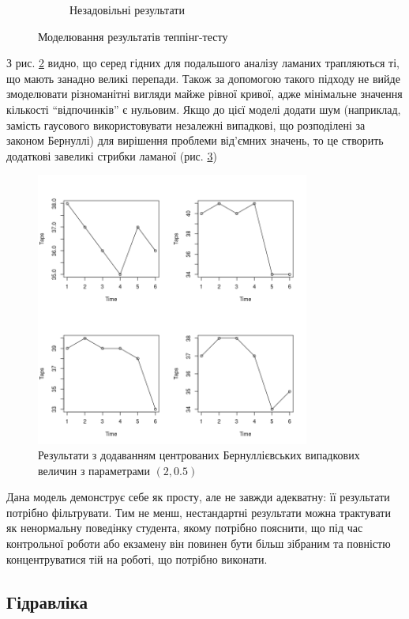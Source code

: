 \begin{figure}[h]
\begin{subfigure}[b]{0.4\textwidth}
    \caption{Незадовільні результати}
    \label{fig:poisson:wrong}
  \end{subfigure}
  \caption{Моделювання результатів теппінг-тесту}
  \label{fig:tapping:poisson}
\end{figure}

З рис. \ref{fig:tapping:poisson} видно, що серед гідних для подальшого аналізу
ламаних трапляються ті, що мають занадно великі перепади.
Також за допомогою такого підходу не вийде змоделювати різноманітні вигляди
майже рівної кривої, адже мінімальне значення кількості ``відпочинків'' є
нульовим.
Якщо до цієї моделі додати шум (наприклад, замість гаусового використовувати
незалежні випадкові, що розподілені за законом Бернуллі) для вирішення проблеми
від’ємних значень, то це створить додаткові завеликі стрибки ламаної
(рис. \ref{fig:poisson:bernoulli})
\begin{figure}[h]
  \centering
  \includegraphics[width=9cm]{code/bernoulli}
  \caption{Результати з додаванням центрованих Бернуллієвських випадкових
  величин з параметрами $\left( 2, 0.5 \right)$}
  \label{fig:poisson:bernoulli}
\end{figure}

Дана модель демонструє себе як просту, але не завжди адекватну: її результати
потрібно фільтрувати.
Тим не менш, нестандартні результати можна трактувати як ненормальну поведінку
студента, якому потрібно пояснити, що під час контрольної роботи або екзамену
він повинен бути більш зібраним та повністю концентруватися тій на роботі, що
потрібно виконати.

\subsection{Гідравліка}

